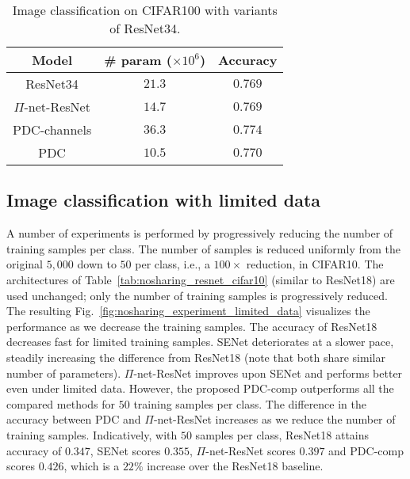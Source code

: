 \documentclass[runningheads]{llncs}
\newcommand{\resnet}{ResNet}
\newcommand{\modelres}{$\Pi$-net-\resnet}
\newcommand{\sne}{SENet}
\newcommand{\noshare}{PDC}
\begin{document}
\begin{table}[h]
\centering
    \caption{Image classification on CIFAR100 with variants of \resnet34.} 
     \begin{tabular}{|c | c | c|}
         \hline
         \textbf{Model} & \textbf{\# param ($\times 10^6$)} & \textbf{Accuracy}\\
        \hline
         \resnet34 & $21.3$ & $0.769$\\\hline
         \modelres &  ${14.7}$ & $0.769$\\\hline
         \noshare-channels & $36.3$ & $\bm{0.774}$\\\hline  
         \noshare &  $\bm{10.5}$ & $0.770$\\\hline
     \end{tabular}
     
 \label{tab:nosharing_resnet_cifar100_resnet34}
\end{table}





\subsection{Image classification with limited data}
\label{ssec:nosharing_experiments_limited_data}

A number of experiments is performed by progressively reducing the number of training samples per class. The number of samples is reduced uniformly from the original $5,000$ down to $50$ per class, i.e., a $100\times$ reduction, in CIFAR10. The architectures of Table~\ref{tab:nosharing_resnet_cifar10} (similar to \resnet18) are used unchanged; only the number of training samples is progressively reduced. The resulting Fig.~\ref{fig:nosharing_experiment_limited_data} visualizes the performance as we decrease the training samples. The accuracy of \resnet18 decreases fast for limited training samples. \sne{} deteriorates at a slower pace, steadily increasing the difference from \resnet18 (note that both share similar number of parameters). \modelres{} improves upon \sne{} and performs better even under limited data. However, the proposed \noshare-comp outperforms all the compared methods for $50$ training samples per class. The difference in the accuracy between \noshare{} and \modelres{} increases as we reduce the number of training samples. Indicatively, with $50$ samples per class, \resnet18 attains accuracy of $0.347$, \sne{} scores $0.355$, \modelres{} scores $0.397$ and \noshare-comp scores $0.426$, which is a $22\%$ increase over the \resnet18 baseline. 
\end{document}
